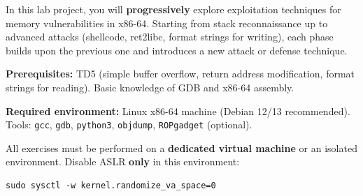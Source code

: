 \documentclass[a4paper,11pt]{article}
\theoremstyle{plain}
\theoremstyle{definition}
\begin{document}
\noindent
In this lab project, you will \textbf{progressively} explore exploitation techniques for memory vulnerabilities in x86-64. Starting from stack reconnaissance up to advanced attacks (shellcode, ret2libc, format strings for writing), each phase builds upon the previous one and introduces a new attack or defense technique.

\medskip
\noindent\textbf{Prerequisites:} TD5 (simple buffer overflow, return address modification, format strings for reading). Basic knowledge of GDB and x86-64 assembly.

\medskip
\noindent\textbf{Required environment:} Linux x86-64 machine (Debian 12/13 recommended). Tools: \texttt{gcc}, \texttt{gdb}, \texttt{python3}, \texttt{objdump}, \texttt{ROPgadget} (optional).

\bigskip

\begin{attention}
All exercises must be performed on a \textbf{dedicated virtual machine} or an isolated environment. Disable ASLR \textbf{only} in this environment:
\begin{lstlisting}[style=GDBStyle]
sudo sysctl -w kernel.randomize_va_space=0
\end{lstlisting}
\end{attention}

\bigskip

\end{document}
